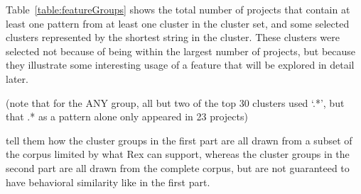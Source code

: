 Table~\ref{table:featureGroups} shows the total number of projects that contain at least one pattern from at least one cluster in the cluster set, and some selected clusters represented by the shortest string in the cluster.  These clusters were selected not because of being within the largest number of projects, but because they illustrate some interesting usage of a feature that will be explored in detail later.




(note that for the ANY group, all but two of the top 30 clusters used `.*', but that .* as a pattern alone only appeared in 23 projects)


tell them how the cluster groups in the first part are all drawn from a subset of the corpus limited by what Rex can support, whereas the cluster groups in the second part are all drawn from the complete corpus, but are not guaranteed to have behavioral similarity like in the first part.








